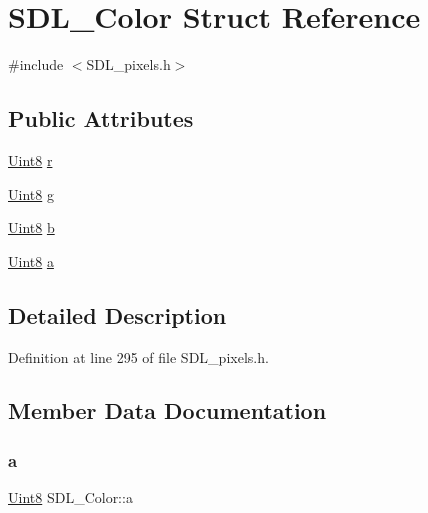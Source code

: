 \hypertarget{struct_s_d_l___color}{}\section{S\+D\+L\+\_\+\+Color Struct Reference}
\label{struct_s_d_l___color}


{\ttfamily \#include $<$S\+D\+L\+\_\+pixels.\+h$>$}

\subsection*{Public Attributes}
\begin{DoxyCompactItemize}
\item 
\mbox{\hyperlink{_s_d_l__stdinc_8h_a2944638813a090aa23e62f4da842c3e2}{Uint8}} \mbox{\hyperlink{struct_s_d_l___color_a0bb975b6829524133fdd3c6060cfa63d}{r}}
\item 
\mbox{\hyperlink{_s_d_l__stdinc_8h_a2944638813a090aa23e62f4da842c3e2}{Uint8}} \mbox{\hyperlink{struct_s_d_l___color_ae29d881bf740cfa7078b36e07f85d298}{g}}
\item 
\mbox{\hyperlink{_s_d_l__stdinc_8h_a2944638813a090aa23e62f4da842c3e2}{Uint8}} \mbox{\hyperlink{struct_s_d_l___color_a3b79a27e0414049559aa5bcf241dedd3}{b}}
\item 
\mbox{\hyperlink{_s_d_l__stdinc_8h_a2944638813a090aa23e62f4da842c3e2}{Uint8}} \mbox{\hyperlink{struct_s_d_l___color_ac497ba67af6ecb4d51bdd0945b314526}{a}}
\end{DoxyCompactItemize}


\subsection{Detailed Description}


Definition at line 295 of file S\+D\+L\+\_\+pixels.\+h.



\subsection{Member Data Documentation}
\mbox{\label{struct_s_d_l___color_ac497ba67af6ecb4d51bdd0945b314526}} 
\subsubsection{\texorpdfstring{a}{a}}
{\footnotesize\ttfamily \mbox{\hyperlink{_s_d_l__stdinc_8h_a2944638813a090aa23e62f4da842c3e2}{Uint8}} S\+D\+L\+\_\+\+Color\+::a}



